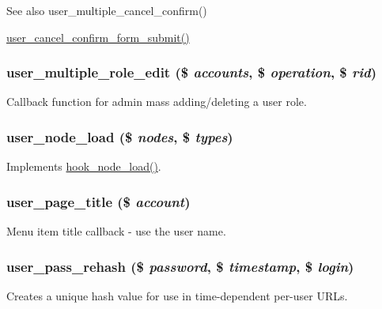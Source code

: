 \begin{DoxySeeAlso}{See also}
user\_\-multiple\_\-cancel\_\-confirm() 

\hyperlink{user_8pages_8inc_a44992d6b5034c5e58010d46316368308}{user\_\-cancel\_\-confirm\_\-form\_\-submit()} 
\end{DoxySeeAlso}
\hypertarget{user_8module_ad0fd9700bee0f36a9f873deb2c80c534}{
\subsubsection[{user\_\-multiple\_\-role\_\-edit}]{\setlength{\rightskip}{0pt plus 5cm}user\_\-multiple\_\-role\_\-edit (\$ {\em accounts}, \/  \$ {\em operation}, \/  \$ {\em rid})}}
\label{user_8module_ad0fd9700bee0f36a9f873deb2c80c534}
Callback function for admin mass adding/deleting a user role. \hypertarget{user_8module_adc38581bf39fce0ac244033595207933}{
\subsubsection[{user\_\-node\_\-load}]{\setlength{\rightskip}{0pt plus 5cm}user\_\-node\_\-load (\$ {\em nodes}, \/  \$ {\em types})}}
\label{user_8module_adc38581bf39fce0ac244033595207933}
Implements \hyperlink{group__node__api__hooks_gad48bb14b68ed38526029d1f7ac2d2de4}{hook\_\-node\_\-load()}. \hypertarget{user_8module_ae37fe690b0461ac2b81b25fa3d51ecc8}{
\subsubsection[{user\_\-page\_\-title}]{\setlength{\rightskip}{0pt plus 5cm}user\_\-page\_\-title (\$ {\em account})}}
\label{user_8module_ae37fe690b0461ac2b81b25fa3d51ecc8}
Menu item title callback -\/ use the user name. \hypertarget{user_8module_a1d3ca7bcffa02f5785618cd86efeac7d}{
\subsubsection[{user\_\-pass\_\-rehash}]{\setlength{\rightskip}{0pt plus 5cm}user\_\-pass\_\-rehash (\$ {\em password}, \/  \$ {\em timestamp}, \/  \$ {\em login})}}
\label{user_8module_a1d3ca7bcffa02f5785618cd86efeac7d}
Creates a unique hash value for use in time-\/dependent per-\/user URLs.

